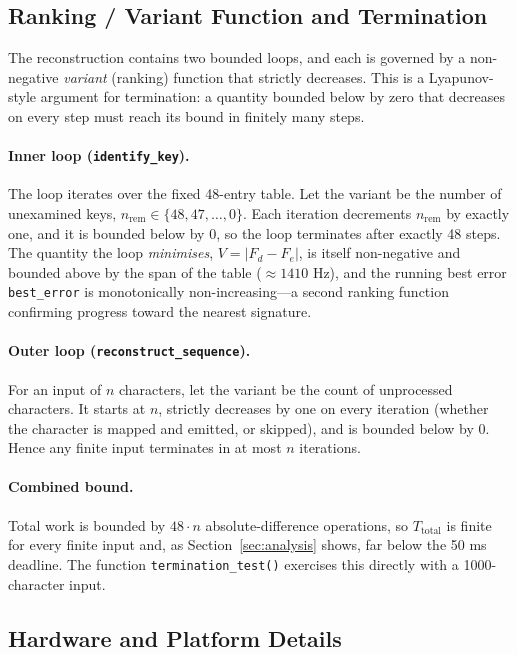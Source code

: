 \documentclass[11pt,a4paper]{article}
\begin{document}
\subsection{Ranking / Variant Function and Termination}
\label{sec:variant}

The reconstruction contains two bounded loops, and each is governed by a
non-negative \emph{variant} (ranking) function that strictly decreases. This is
a Lyapunov-style argument for termination: a quantity bounded below by zero that
decreases on every step must reach its bound in finitely many steps.

\paragraph{Inner loop (\texttt{identify\_key}).}
The loop iterates over the fixed 48-entry table. Let the variant be the number
of unexamined keys, $n_{\text{rem}} \in \{48, 47, \ldots, 0\}$. Each iteration
decrements $n_{\text{rem}}$ by exactly one, and it is bounded below by $0$, so
the loop terminates after exactly 48 steps. The quantity the loop
\emph{minimises}, $V = |F_d - F_e|$, is itself non-negative and bounded above by
the span of the table ($\approx 1410$ Hz), and the running best error
\texttt{best\_error} is monotonically non-increasing---a second ranking function
confirming progress toward the nearest signature.

\paragraph{Outer loop (\texttt{reconstruct\_sequence}).}
For an input of $n$ characters, let the variant be the count of unprocessed
characters. It starts at $n$, strictly decreases by one on every iteration
(whether the character is mapped and emitted, or skipped), and is bounded below
by $0$. Hence any finite input terminates in at most $n$ iterations.

\paragraph{Combined bound.}
Total work is bounded by $48 \cdot n$ absolute-difference operations, so
$T_{\text{total}}$ is finite for every finite input and, as
Section~\ref{sec:analysis} shows, far below the 50 ms deadline. The function
\texttt{termination\_test()} exercises this directly with a 1000-character
input.

\subsection{Hardware and Platform Details}
\end{document}
